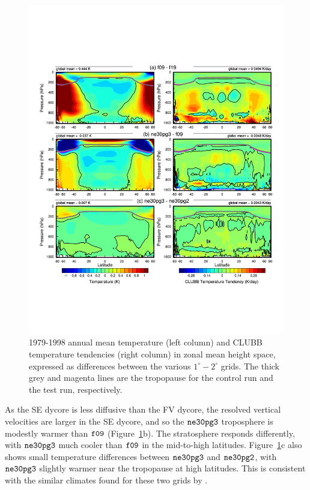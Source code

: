 \documentclass[draft]{agujournal2019}
\begin{document}
\begin{figure}[t]
\begin{center}
         \includegraphics[width=130mm]{temp_dhgt_panel_STEND_CLUBB-lores.pdf}
\end{center}
\caption{1979-1998 annual mean temperature (left column) and CLUBB temperature tendencies (right column) in zonal mean height space, expressed as differences between the various $1^{\circ}-2^{\circ}$ grids. The thick grey and magenta lines are the tropopause for the control run and the test run, respectively.}
\label{fig:dT-lores}
\end{figure}

As the SE dycore is less diffusive than the FV dycore, the resolved vertical velocities are larger in the SE dycore, and so the $\tt ne30pg3$ troposphere is modestly warmer than $\tt f09$ (Figure~\ref{fig:dT-lores}b). The stratosphere responds differently, with $\tt ne30pg3$ much cooler than $\tt f09$ in the mid-to-high latitudes. Figure~\ref{fig:dT-lores}c also shows small temperature differences between $\tt ne30pg3$ and $\tt ne30pg2$, with  $\tt ne30pg3$ slightly warmer near the tropopause at high latitudes. This is consistent with the similar climates found for these two grids by .
\end{document}
